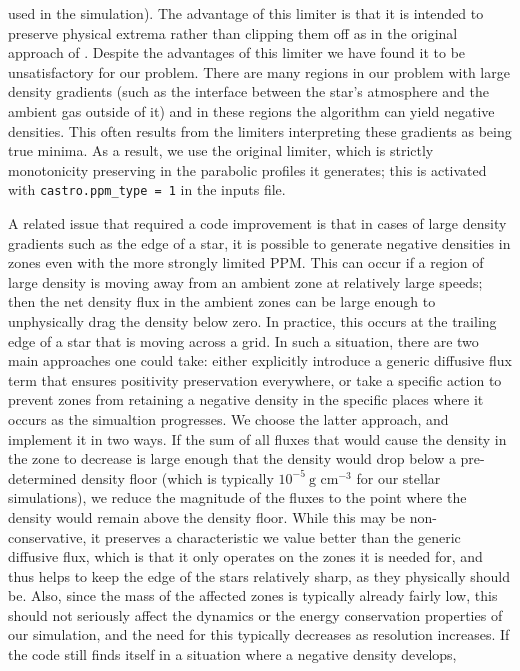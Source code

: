 \documentclass[12pt]{article}
\begin{document}
used in the simulation). The advantage of this limiter is that it is intended
to preserve physical extrema rather than clipping them off as in the
original approach of \cite{ppm}. Despite the advantages of this limiter
we have found it to be unsatisfactory for our problem. There are many regions in our
problem with large density gradients (such as the interface between
the star's atmosphere and the ambient gas outside of it) and in these
regions the algorithm can yield negative densities. This often results
from the limiters interpreting these gradients as being true minima.
As a result, we use the original limiter, which is strictly monotonicity
preserving in the parabolic profiles it generates; this is activated with
\texttt{castro.ppm\_type = 1} in the inputs file.

A related issue that required a code improvement is that in cases of
large density gradients such as the edge of a star, it is possible to
generate negative densities in zones even with the more strongly
limited PPM. This can occur if a region of large density is moving
away from an ambient zone at relatively large speeds; then the net
density flux in the ambient zones can be large enough to unphysically
drag the density below zero. In practice, this occurs at the
trailing edge of a star that is moving across a grid. In such a
situation, there are two main approaches one could take: either
explicitly introduce a generic diffusive flux term that ensures
positivity preservation everywhere, or take a specific action to
prevent zones from retaining a negative density in the specific places
where it occurs as the simualtion progresses. We choose the latter
approach, and implement it in two ways. If the sum of all fluxes that
would cause the density in the zone to decrease is large enough that the
density would drop below a pre-determined density floor (which is typically
$10^{-5}\ \text{g cm}^{-3}$ for our stellar simulations), we reduce
the magnitude of the fluxes to the point where the density would remain
above the density floor. While this may be non-conservative, it preserves a
characteristic we value better than the generic diffusive flux, which is that
it only operates on the zones it is needed for, and thus helps to keep the
edge of the stars relatively sharp, as they physically should be. Also, since
the mass of the affected zones is typically already fairly low, this should not
seriously affect the dynamics or the energy conservation properties of our
simulation, and the need for this typically decreases as resolution increases.
If the code still finds itself in a situation where a negative density develops,
\end{document}
